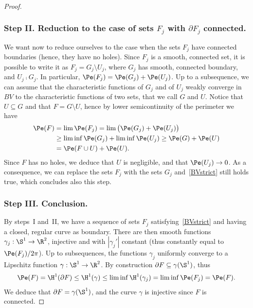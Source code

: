 \begin{proof}
\subsubsection*{Step II. Reduction to the case of sets $F_j$ with $\partial F_j$ connected.}
We want now to reduce ourselves to the case when the sets $F_j$ have connected boundaries (hence, they have no holes). Since $F_j$ is a smooth, connected set, it is possible to write it as $F_j=G_j\setminus U_j$, where $G_j$ has smooth, connected boundary, and $U_j\comp G_j$. In particular, $\Pe(F_j)=\Pe(G_j)+\Pe(U_j)$. Up to a subsequence, we can assume that the characteristic functions of $G_j$ and of $U_j$ weakly converge in $BV$ to the characteristic functions of two sets, that we call $G$ and $U$. Notice that $U\subseteq G$ and that $F=G\setminus U$, hence by lower semicontinuity of the perimeter we have
\[\begin{split}
\Pe(F)&=\lim \Pe(F_j) = \lim \big(\Pe(G_j) + \Pe(U_j)\big)\\
&\geq \liminf \Pe(G_j) + \liminf \Pe(U_j)
\geq \Pe(G) + \Pe(U)\\
&= \Pe(F\cup U) + \Pe(U).
\end{split}\]
Since $F$ has no holes, we deduce that $U$ is negligible, and that $\Pe(U_j)\to 0$. As a consequence, we can replace the sets $F_j$ with the sets $G_j$ and~\eqref{BVstrict} still holds true, which concludes also this step.

\subsubsection*{Step III. Conclusion.}
By steps~I and~II, we have a sequence of sets $F_j$ satisfying~\eqref{BVstrict} and having a closed, regular curve as boundary. There are then smooth functions $\gamma_j:\S^1\to\R^2$, injective and with $|\gamma_j'|$ constant (thus constantly equal to $\Pe(F_j)/2\pi$). Up to subsequences, the functions $\gamma_j$ uniformly converge to a Lipschitz function $\gamma:\S^1\to\R^2$. By construction $\partial F\subseteq \gamma(\S^1)$, thus
\[
\Pe(F) = \H^1(\partial F)\leq \H^1(\gamma) \leq \liminf\H^1(\gamma_j) =\liminf \Pe(F_j) = \Pe(F).
\]
We deduce that $\partial F=\gamma(\S^1)$, and the curve $\gamma$ is injective since $F$ is connected.
\end{proof}

